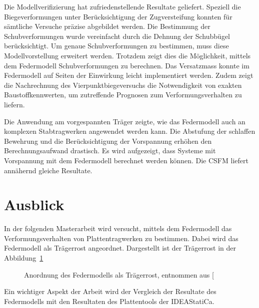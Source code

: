 \documentclass[
  11pt,
  letterpaper,
]{scrreprt}
\begin{document}
Die Modellverifizierung hat zufriedenstellende Resultate geliefert.
Speziell die Biegeverformungen unter Berücksichtigung der Zugversteifung
konnten für sämtliche Versuche präzise abgebildet werden. Die Bestimmung
der Schubverformungen wurde vereinfacht durch die Dehnung der Schubbügel
berücksichtigt. Um genaue Schubverformungen zu bestimmen, muss diese
Modellvorstellung erweitert werden. Trotzdem zeigt dies die Möglichkeit,
mittels dem Federmodell Schubverformungen zu berechnen. Das Versatzmass
konnte im Federmodell auf Seiten der Einwirkung leicht implementiert
werden. Zudem zeigt die Nachrechnung des Vierpunktbiegeversuchs die
Notwendigkeit von exakten Baustoffkennwerten, um zutreffende Prognosen
zum Verformungsverhalten zu liefern.

Die Anwendung am vorgespannten Träger zeigte, wie das Federmodell auch
an komplexen Stabtragwerken angewendet werden kann. Die Abstufung der
schlaffen Bewehrung und die Berücksichtigung der Vorspannung erhöhen den
Berechnungsaufwand drastisch. Es wird aufgezeigt, dass Systeme mit
Vorspannung mit dem Federmodell berechnet werden können. Die CSFM
liefert annähernd gleiche Resultate.

\section{Ausblick}\label{ausblick}

In der folgenden Masterarbeit wird versucht, mittels dem Federmodell das
Verformungsverhalten von Plattentragwerken zu bestimmen. Dabei wird das
Federmodell als Trägerrost angeordnet. Dargestellt ist der Trägerrost in
der Abbildung~\ref{fig-traegerrost}

\begin{figure}[H]


\caption{\label{fig-traegerrost}Anordnung des Federmodells als
Trägerrost, entnommen aus {[}\citeproc{ref-gitz_ansatze_2024}{1}{]}}

\end{figure}%

Ein wichtiger Aspekt der Arbeit wird der Vergleich der Resultate des
Federmodells mit den Resultaten des Plattentools der IDEAStatiCa.

\newpage{}

\end{document}
